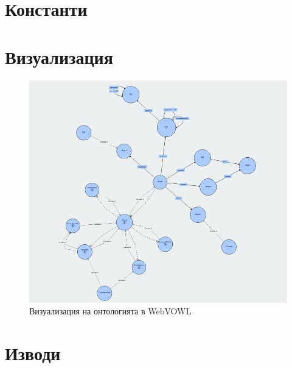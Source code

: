 \documentclass[a4paper, 11pt]{article}
\begin{document}
\section{Константи}


\section{Визуализация}
\begin{figure}[H]
  \centering
  \includegraphics[width=\linewidth]{images/onto.png}  
  \caption{Визуализация на онтологията в WebVOWL}
\end{figure}

\section{Изводи}
\end{document}
